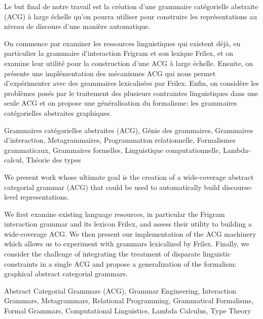 \newpage


\begin{description}[style=nextline]
\item[Résumé]

Le but final de notre travail est la création d'une grammaire
catégorielle abstraite (ACG) à large échelle qu'on pourra utiliser pour
construire les représentations au niveau de discours d'une manière
automatique.

On commence par examiner les ressources linguistiques qui existent déjà,
en particulier la grammaire d'interaction Frigram et son lexique Frilex,
et on examine leur utilité pour la construction d'une ACG à large
échelle. Ensuite, on présente une implémentation des mécanismes ACG qui
nous permet d'expérimenter avec des grammaires lexicalisées par
Frilex. Enfin, on considère les problèmes posés par le traitement des
plusieurs contraintes linguistiques dans une seule ACG et on propose une
généralisation du formalisme: les grammaires catégorielles abstraites
graphiques.

\item[Mots-clés]

Grammaires catégorielles abstraites (ACG), Génie des grammaires,
Grammaires d'interaction, Metagrammaires, Programmation relationnelle,
Formalismes grammaticaux, Grammaires formelles, Linguistique
computationnelle, Lambda-calcul, Théorie des types
\end{description}

\vfill

\begin{description}[style=nextline]
\item[Summary]

We present work whose ultimate goal is the creation of a wide-coverage
abstract categorial grammar (ACG) that could be used to automatically
build discourse-level representations.

We first examine existing language resources, in particular the Frigram
interaction grammar and its lexicon Frilex, and assess their utility to
building a wide-coverage ACG. We then present our implementation of the
ACG machinery which allows us to experiment with grammars lexicalized by
Frilex. Finally, we consider the challenge of integrating the treatment
of disparate linguistic constraints in a single ACG and propose a
generalization of the formalism: graphical abstract categorial
grammars.

\item[Keywords]

Abstract Categorial Grammars (ACG), Grammar Engineering, Interaction
Grammars, Metagrammars, Relational Programming, Grammatical Formalisms,
Formal Grammars, Computational Linguistics, Lambda Calculus, Type Theory
\end{description}

